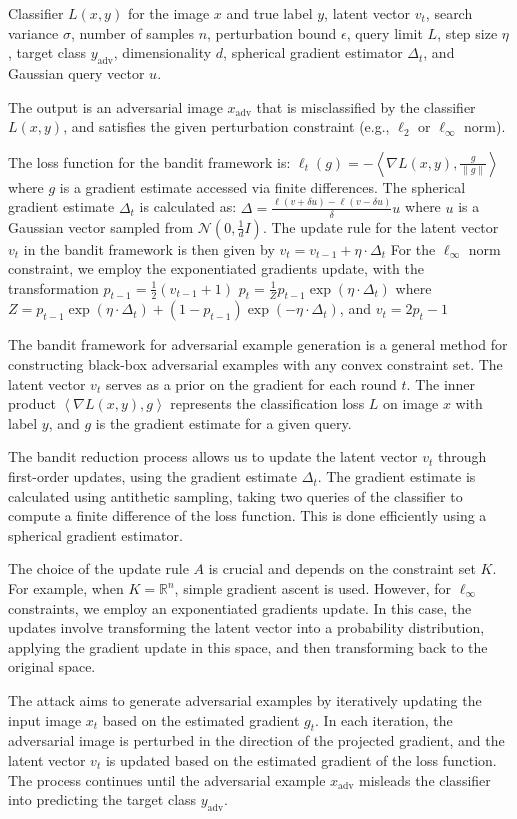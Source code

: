 
Classifier $L(x, y)$ for the image $x$ and true label $y$, latent vector $v_t$, search variance $\sigma$, number of samples $n$, perturbation bound $\epsilon$, query limit $L$, step size $\eta$, target class $y_{\text{adv}}$, dimensionality $d$, spherical gradient estimator $\Delta_t$, and Gaussian query vector $u$.

The output is an adversarial image $x_{\text{adv}}$ that is misclassified by the classifier $L(x, y)$, and satisfies the given perturbation constraint (e.g., $\ell_2$ or $\ell_\infty$ norm).

The loss function for the bandit framework is:
$\ell_t(g) = -\left\langle \nabla L(x, y), \frac{g}{\|g\|} \right\rangle$
where $g$ is a gradient estimate accessed via finite differences. The spherical gradient estimate $\Delta_t$ is calculated as:
$\Delta = \frac{\ell(v + \delta u) - \ell(v - \delta u)}{\delta} u$
where $u$ is a Gaussian vector sampled from $\mathcal{N}(0, \frac{1}{d} I)$. The update rule for the latent vector $v_t$ in the bandit framework is then given by $v_t = v_{t-1} + \eta \cdot \Delta_t$
For the $\ell_\infty$ norm constraint, we employ the exponentiated gradients update, with the transformation $p_{t-1} = \frac{1}{2} (v_{t-1} + 1)$
$p_t = \frac{1}{Z} p_{t-1} \exp(\eta \cdot \Delta_t)$
where $Z = p_{t-1} \exp(\eta \cdot \Delta_t) + (1 - p_{t-1}) \exp(-\eta \cdot \Delta_t)$, and $v_t = 2p_t - 1$

The bandit framework for adversarial example generation is a general method for constructing black-box adversarial examples with any convex constraint set. The latent vector $v_t$ serves as a prior on the gradient for each round $t$. The inner product $\left\langle \nabla L(x, y), g \right\rangle$ represents the classification loss $L$ on image $x$ with label $y$, and $g$ is the gradient estimate for a given query. 

The bandit reduction process allows us to update the latent vector $v_t$ through first-order updates, using the gradient estimate $\Delta_t$. The gradient estimate is calculated using antithetic sampling, taking two queries of the classifier to compute a finite difference of the loss function. This is done efficiently using a spherical gradient estimator.

The choice of the update rule $A$ is crucial and depends on the constraint set $K$. For example, when $K = \mathbb{R}^n$, simple gradient ascent is used. However, for $\ell_\infty$ constraints, we employ an exponentiated gradients update. In this case, the updates involve transforming the latent vector into a probability distribution, applying the gradient update in this space, and then transforming back to the original space.

The attack aims to generate adversarial examples by iteratively updating the input image $x_t$ based on the estimated gradient $g_t$. In each iteration, the adversarial image is perturbed in the direction of the projected gradient, and the latent vector $v_t$ is updated based on the estimated gradient of the loss function. The process continues until the adversarial example $x_{\text{adv}}$ misleads the classifier into predicting the target class $y_{\text{adv}}$.